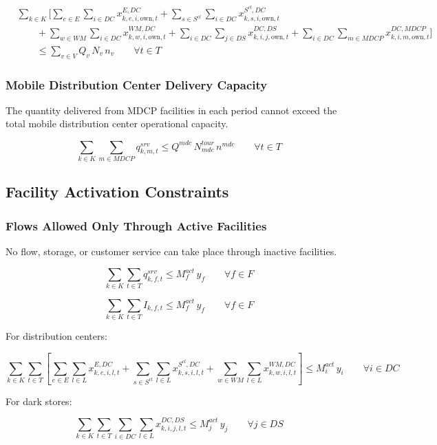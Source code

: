\documentclass[12pt]{article}
\begin{document}
\begin{align*}
& \sum_{k \in K}
\Bigg[
\sum_{e \in E}\sum_{i \in DC} x^{E,DC}_{k,e,i,\text{own},t}
+
\sum_{s \in S^{cl}}\sum_{i \in DC} x^{S^{cl},DC}_{k,s,i,\text{own},t}
\\
& \qquad +
\sum_{w \in WM}\sum_{i \in DC} x^{WM,DC}_{k,w,i,\text{own},t}
+
\sum_{i \in DC}\sum_{j \in DS} x^{DC,DS}_{k,i,j,\text{own},t}
+
\sum_{i \in DC}\sum_{m \in MDCP} x^{DC,MDCP}_{k,i,m,\text{own},t}
\Bigg]
\\
& \qquad \leq \sum_{v \in V} Q_v\, N_v\, n_v
\qquad
\forall t \in T
\end{align*}

\subsubsection{Mobile Distribution Center Delivery Capacity}

The quantity delivered from MDCP facilities in each period cannot exceed the total mobile distribution center operational capacity.

\[
\sum_{k \in K}\sum_{m \in MDCP} q^{srv}_{k,m,t}
\leq
Q^{mdc}\, N^{tour}_{mdc}\, n^{mdc}
\qquad
\forall t \in T
\]

\subsection{Facility Activation Constraints}

\subsubsection{Flows Allowed Only Through Active Facilities}

No flow, storage, or customer service can take place through inactive facilities.

\[
\sum_{k \in K}\sum_{t \in T} q^{srv}_{k,f,t}
\leq
M^{act}_f\, y_f
\qquad
\forall f \in F
\]

\[
\sum_{k \in K}\sum_{t \in T} I_{k,f,t}
\leq
M^{act}_f\, y_f
\qquad
\forall f \in F
\]

For distribution centers:

\[
\sum_{k \in K}\sum_{t \in T}
\left[
\sum_{e \in E}\sum_{l \in L} x^{E,DC}_{k,e,i,l,t}
+
\sum_{s \in S^{cl}}\sum_{l \in L} x^{S^{cl},DC}_{k,s,i,l,t}
+
\sum_{w \in WM}\sum_{l \in L} x^{WM,DC}_{k,w,i,l,t}
\right]
\leq
M^{act}_i\, y_i
\qquad
\forall i \in DC
\]

For dark stores:

\[
\sum_{k \in K}\sum_{t \in T}\sum_{i \in DC}\sum_{l \in L}
x^{DC,DS}_{k,i,j,l,t}
\leq
M^{act}_j\, y_j
\qquad
\forall j \in DS
\]
\end{document}
